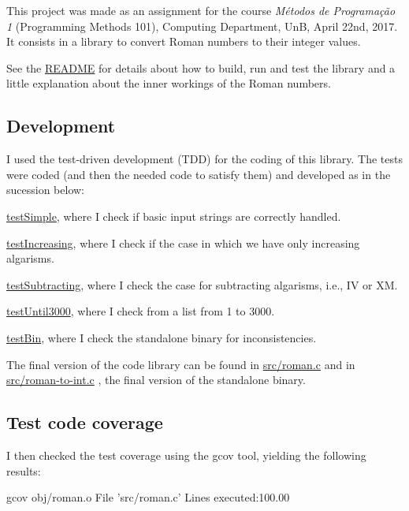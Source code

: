 This project was made as an assignment for the course {\itshape Métodos de Programação 1} (Programming Methods 101), Computing Department, UnB, April 22nd, 2017. It consists in a library to convert Roman numbers to their integer values.

See the \hyperlink{md_README}{R\+E\+A\+D\+ME} for details about how to build, run and test the library and a little explanation about the inner workings of the Roman numbers.

\subsection*{Development }

I used the test-\/driven development (T\+DD) for the coding of this library. The tests were coded (and then the needed code to satisfy them) and developed as in the sucession below\+:


\begin{DoxyEnumerate}
\item \hyperlink{md_doc_testSimple}{test\+Simple}, where I check if basic input strings are correctly handled.
\item \hyperlink{md_doc_testIncreasing}{test\+Increasing}, where I check if the case in which we have only increasing algarisms.
\item \hyperlink{md_doc_testSubtracting}{test\+Subtracting}, where I check the case for subtracting algarisms, i.\+e., IV or XM.
\item \hyperlink{md_doc_testUntil3000}{test\+Until3000}, where I check from a list from 1 to 3000.
\item \hyperlink{md_doc_testBin}{test\+Bin}, where I check the standalone binary for inconsistencies.
\end{DoxyEnumerate}

The final version of the code library can be found in \hyperlink{roman_8c}{src/roman.\+c} and in \hyperlink{roman-to-int_8c}{src/roman-\/to-\/int.\+c} , the final version of the standalone binary.

\subsection*{Test code coverage }

I then checked the test coverage using the gcov tool, yielding the following results\+:


\begin{DoxyCode}
gcov obj/roman.o
File \textcolor{stringliteral}{'src/roman.c'}
Lines executed:100.00%
\end{DoxyCode}



